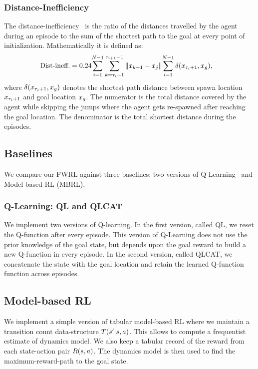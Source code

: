 \subsubsection{Distance-Inefficiency} The distance-inefficiency~\citep{dhiman2018critical} is the ratio of the
      distances travelled by the agent during an episode to the sum of the shortest
      path to the goal at every point of initialization. Mathematically it is defined
      as:
		\begin{align}
			\text{Dist-ineff.} &=
			0.24{ \sum_{i=1}^{N-1} \sum_{k=\tau_i + 1}^{\tau_{i+1} - 1} \|x_{k+1} - x_{j}\| }
			{ \sum_{i=1}^{N-1} \delta(x_{\tau_i + 1}, x_g) } ,
		\end{align}%
		where $\delta(x_{\tau_i +1}, x_g)$ denotes the shortest path
		distance between spawn location $x_{\tau_i+1}$ and goal location
        $x_g$. The numerator is the total distance covered by the agent while
        skipping the jumps where the agent gets re-spawned after reaching the
        goal location. The denominator is the total shortest distance during the
        episodes.

\subsection{Baselines}
We compare our FWRL against three baselines: two versions of
Q-Learning~\cite{watkins1992qlearning} and Model based RL (MBRL).

\subsubsection{Q-Learning: QL and QLCAT}
We implement two versions of Q-learning. In the first version, called QL, we
reset the Q-function after every episode. This version of Q-Learning does not
use the prior knowledge of the goal state, but depends upon the goal reward to
build a new Q-function in every episode. In the second version, called QLCAT,
we concatenate the state with the goal location and retain the learned Q-function
function across episodes. 

\subsection{Model-based RL}
We implement a simple version of tabular model-based RL where we maintain a
transition count data-structure $T(s' | s, a)$.
This allows to compute a frequentist estimate of dynamics model.
We also keep a tabular record of the reward from each state-action pair
$R(s, a)$. The dynamics model is then used to find the
maximum-reward-path to the goal state.


